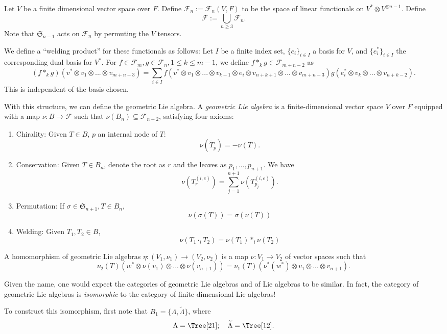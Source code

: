 \documentclass{article}
\newcommand{\Ff}{\mathcal{F}}
\newcommand{\Sym}{\mathfrak{S}}
\begin{document}
Let $V$ be a finite dimensional vector space over $F$.  Define $\Ff_n:=\Ff_n(V,F)$ to be the space of linear functionals on $V^* \otimes V^{\otimes n-1}$.  Define
\[\Ff := \bigcup_{n \ge 3} \Ff_n. \]
Note that $\Sym_{n-1}$ acts on $\Ff_n$ by permuting the $V$ tensors.

We define a ``welding product'' for these functionals as follows: Let $I$ be a finite index set, $\{e_i\}_{i \in I}$ a basis for $V$, and $\{e^*_i\}_{i \in I}$ the corresponding dual basis for $V^*$.  For $f \in \Ff_m, g \in \Ff_n, 1 \le k \le m-1$, we define $f *_k g \in \Ff_{m+n-2}$ as
\[ (f *_k g)(v^* \otimes v_1 \otimes ... \otimes v_{m+n-3}) = \sum_{i \in I}f(v^* \otimes v_1 \otimes ... \otimes v_{k-1} \otimes e_i \otimes v_{n+k+1} \otimes ... \otimes v_{m+n-3}) g(e^*_i \otimes v_k \otimes ... \otimes v_{n+k-2}). \]
This is independent of the basis chosen.

With this structure, we can define the geometric Lie algebra.  A \textit{geometric Lie algebra} is a finite-dimensional vector space $V$ over $F$ equipped with a map $\nu: B \rightarrow \Ff$ such that $\nu(B_n) \subseteq \Ff_{n+2}$, satisfying four axioms:
\begin{enumerate}
\item Chirality: Given $T \in B$, $p$ an internal node of $T$:
\[\nu(\widetilde{T}_p)=-\nu(T). \]
\item Conservation: Given $T \in B_n$, denote the root as $r$ and the leaves as $p_1,...,p_{n+1}$.  We have
\[\nu(T^{(i,e)}_r)=\sum_{j=1}^{n+1}\nu(T^{(i,e)}_{p_j}). \]
\item Permutation: If $\sigma \in \Sym_{n+1}, T \in B_n$,
\[\nu(\sigma(T))=\sigma(\nu(T)) \]
\item Welding: Given $T_1,T_2 \in B$,
\[\nu(T_1 \cdot_i T_2)=\nu(T_1) *_i \nu(T_2) \]
\end{enumerate}
A homomorphism of geometric Lie algebras $\eta: (V_1,\nu_1) \rightarrow (V_2,\nu_2)$ is a map $\nu: V_1 \rightarrow V_2$ of vector spaces such that
\[\nu_2(T)(w^* \otimes \nu(v_1) \otimes ... \otimes \nu(v_{n+1}))=\nu_1(T)(\nu^*(w^*) \otimes v_1 \otimes ... \otimes v_{n+1}). \]

Given the name, one would expect the categories of geometric Lie algebras and of Lie algebras to be similar.  In fact, the category of geometric Lie algebras is \textit{isomorphic} to the category of finite-dimensional Lie algebras!

To construct this isomorphism, first note that $B_1=\{\Lambda,\widetilde{\Lambda}\}$, where
\[\Lambda=\Tree[ 2 1 ]; \quad \widetilde{\Lambda}=\Tree[ 1 2 ]. \]
\end{document}
